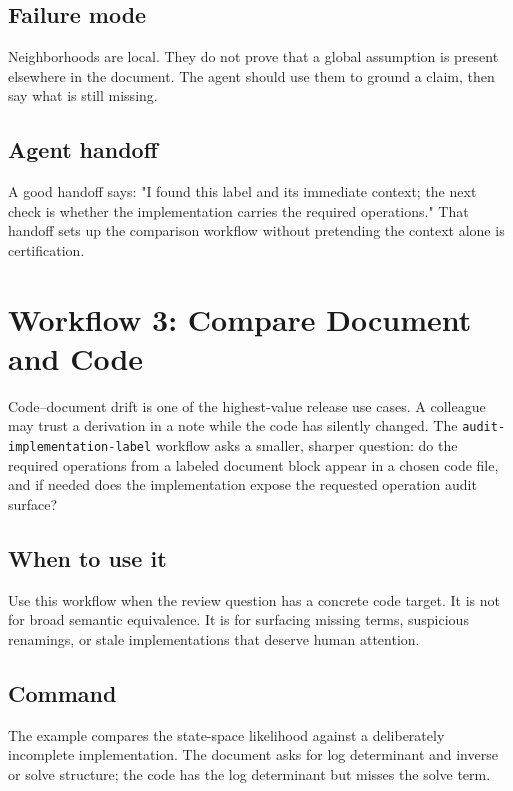 \documentclass[12pt,a4paper,openany]{book}
\begin{document}
\section*{Failure mode}

Neighborhoods are local. They do not prove that a global assumption is present
elsewhere in the document. The agent should use them to ground a claim, then say
what is still missing.

\section*{Agent handoff}

A good handoff says: "I found this label and its immediate context; the next
check is whether the implementation carries the required operations." That
handoff sets up the comparison workflow without pretending the context alone is
certification.

\chapter{Workflow 3: Compare Document and Code}

Code--document drift is one of the highest-value release use cases. A colleague
may trust a derivation in a note while the code has silently changed. The
\texttt{audit-implementation-label} workflow asks a smaller, sharper question: do
the required operations from a labeled document block appear in a chosen code
file, and if needed does the implementation expose the requested operation audit
surface?

\section*{When to use it}

Use this workflow when the review question has a concrete code target. It is not
for broad semantic equivalence. It is for surfacing missing terms, suspicious
renamings, or stale implementations that deserve human attention.

\section*{Command}

The example compares the state-space likelihood against a deliberately
incomplete implementation. The document asks for log determinant and inverse or
solve structure; the code has the log determinant but misses the solve term.
\end{document}
